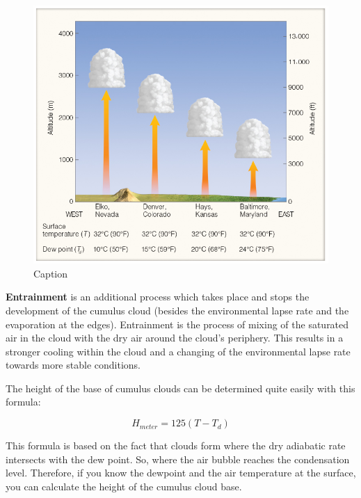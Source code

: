 \documentclass[12pt,oneside]{book}
\begin{document}
\begin{figure}

{\centering \includegraphics[width=0.9\linewidth]{figures/Figure319} 

}

\caption{Caption}\label{fig:Cumulus2}
\end{figure}

\textbf{Entrainment} is an additional process which takes place and
stops the development of the cumulus cloud (besides the environmental
lapse rate and the evaporation at the edges). Entrainment is the process
of mixing of the saturated air in the cloud with the dry air around the
cloud's periphery. This results in a stronger cooling within the cloud
and a changing of the environmental lapse rate towards more stable
conditions.

The height of the base of cumulus clouds can be determined quite easily
with this formula:

\begin{equation} 
   H_{meter} = 125 \left(T - T_d \right)
   \label{eq:EqHcloud}
\end{equation}

This formula is based on the fact that clouds form where the dry
adiabatic rate intersects with the dew point. So, where the air bubble
reaches the condensation level. Therefore, if you know the dewpoint and
the air temperature at the surface, you can calculate the height of the
cumulus cloud base.
\end{document}

